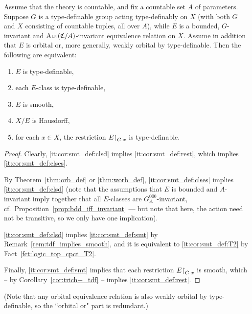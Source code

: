 	\begin{cor}
		\label{cor:smt_def}
		Assume that the theory is countable, and fix a countable set $A$ of parameters. Suppose $G$ is a type-definable group acting type-definably on $X$ (with both $G$ and $X$ consisting of countable tuples, all over $A$), while $E$ is a bounded, $G$-invariant and $\operatorname{{Aut}}({\mathfrak C}/A)$-invariant equivalence relation on $X$. Assume in addition that $E$ is orbital or, more generally, weakly orbital by type-definable. Then the following are equivalent:
		\begin{enumerate}
			\item
			\label{it:cor:smt_def:clsd}
			$E$ is type-definable,
			\item
			\label{it:cor:smt_def:clses}
			each $E$-class is type-definable,
			\item
			\label{it:cor:smt_def:smt}
			$E$ is smooth,
			\item
			\label{it:cor:smt_def:T2}
			$X/E$ is Hausdorff,
			\item
			\label{it:cor:smt_def:rest}
			for each $x\in X$, the restriction $E\mathord{\upharpoonright}_{G\cdot x}$ is type-definable.
		\end{enumerate}
	\end{cor}
	\begin{proof}
		Clearly, \ref{it:cor:smt_def:clsd} implies \ref{it:cor:smt_def:rest}, which implies \ref{it:cor:smt_def:clses}.
		
		By Theorem~\ref{thm:orb_def} or \ref{thm:worb_def}, \ref{it:cor:smt_def:clses} implies \ref{it:cor:smt_def:clsd} (note that the assumptions that $E$ is bounded and $A$-invariant imply together that all $E$-classes are $G^{000}_A$-invariant, cf.\ Proposition~\ref{prop:bdd_iff_invariant} --- but note that here, the action need not be transitive, so we only have one implication).
		
		\ref{it:cor:smt_def:clsd} implies \ref{it:cor:smt_def:smt} by Remark~\ref{rem:tdf_implies_smooth}, and it is equivalent to \ref{it:cor:smt_def:T2} by Fact~\ref{fct:logic_top_cpct_T2}.
		
		Finally, \ref{it:cor:smt_def:smt} implies that each restriction $E\mathord{\upharpoonright}_{G\cdot x}$ is smooth, which -- by Corollary~\ref{cor:trich+_tdf} -- implies \ref{it:cor:smt_def:rest}.
	\end{proof}
	(Note that any orbital equivalence relation is also weakly orbital by type-definable, so the ``orbital or" part is redundant.)
	
	
	
